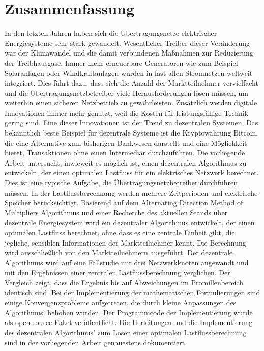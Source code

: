 \section*{Zusammenfassung}

In den letzten Jahren haben sich die Übertragungsnetze elektrischer Energiesysteme sehr stark gewandelt. Wesentlicher Treiber dieser Veränderung war der Klimawandel und die damit verbundenen Maßnahmen zur Reduzierung der Treibhausgase. Immer mehr erneuerbare Generatoren wie zum Beispiel Solaranlagen oder Windkraftanlagen wurden in fast allen Stromnetzen weltweit integriert. Dies führt dazu, dass sich die Anzahl der Marktteilnehmer vervielfacht und die Übertragungsnetzbetreiber viele Herausforderungen lösen müssen, um weiterhin einen sicheren Netz\-betrieb zu gewährleisten. Zusätzlich werden digitale Innovationen immer mehr genutzt, weil die Kosten für leistungsfähige Technik gering sind. Eine dieser Innovationen ist der Trend zu dezentralen Systemen. Das bekanntlich beste Beispiel für dezentrale Systeme ist die Kryptowährung Bitcoin, die eine Alternative zum bisherigen Bankwesen darstellt und eine Möglichkeit bietet, Transaktionen ohne einen Intermediär durchzuführen. Die vorliegende Arbeit untersucht, inwieweit es möglich ist, einen dezentralen Algorithmus zu entwickeln, der einen optimalen Lastfluss für ein elektrisches Netzwerk berechnet. Dies ist eine typische Aufgabe, die Übertragungsnetzbetreiber durchführen müssen. In der Lastflussberechnung werden mehrere Zeitperioden und elektrische Speicher berücksichtigt. Basierend auf dem Alternating Direction Method of Multipliers Algorithmus und einer Recherche des aktuellen Stands über dezentrale Energiesystem wird ein dezentraler Algorithmus entwickelt, der einen optimalen Lastfluss berechnet, ohne dass es eine zentrale Einheit gibt, die jegliche, sensiblen Informationen der Marktteilnehmer kennt. Die Berechnung wird ausschließlich von den Marktteilnehmern ausgeführt. Der dezentrale Algorithmus wird auf eine Fallstudie mit drei Netzwerkknoten angewandt und mit den Ergebnissen einer zentralen Lastflussberechnung verglichen. Der Vergleich zeigt, dass die Ergebnis bis auf Abweichungen im Promillenbereich identisch sind. Bei der Implementierung der mathematischen Formulierungen sind einige Konvergenzprobleme aufgetreten, die durch kleine Anpassungen des Algorithmus' behoben wurden. Der Programmcode der Implementierung wurde als open-source Paket veröffentlicht. Die Herleitungen und die Implementierung des dezentralen Algorithmus' zum Lösen einer optimalen Lastflussberechnung sind in der vorliegenden Arbeit genauestens dokumentiert.